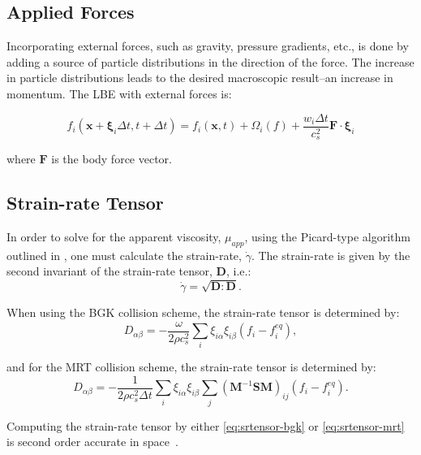 \documentclass[pdftex,ms]{pittetd}
\newcommand{\pos}{\mathbf{x}}
\newcommand{\pvel}{\boldsymbol{\xi}}
\newcommand{\transM}{\mathbf{M}}
\newcommand{\relaxM}{\mathbf{S}}
\begin{document}
\subsection{Applied Forces}

Incorporating external forces, such as gravity, pressure gradients, etc., is done by adding a source of particle distributions in the direction of the force.
The increase in particle distributions leads to the desired macroscopic result--an increase in momentum.
The LBE with external forces is:

\begin{equation}
f_i(\pos + \pvel_i \Delta t, t + \Delta t) = f_i(\pos, t) + \Omega_i(f) + \frac{w_i \Delta t}{c_s^2} \mathbf{F} \cdot \pvel_i
\end{equation}

\noindent where $\mathbf{F}$ is the body force vector.

\newcommand{\srtensor}{\mathbf{D}}

\subsection{Strain-rate Tensor}

In order to solve for the apparent viscosity, $\mu_{app}$, using the Picard-type algorithm outlined in , one must calculate the strain-rate, $\dot{\gamma}$.
The strain-rate is given by the second invariant of the strain-rate tensor, $\srtensor$, i.e.:
\begin{equation} \label{eq:second-invariant}
\dot{\gamma} = \sqrt{\srtensor : \srtensor}.
\end{equation}

\noindent When using the BGK collision scheme, the strain-rate tensor is determined by:
\begin{equation} \label{eq:srtensor-bgk}
D_{\alpha \beta} = -\frac{\omega}{2 \rho c_s^2} \sum_i \xi_{i \alpha} \xi_{i \beta} (f_i - f^{eq}_i),
\end{equation} %

\noindent and for the MRT collision scheme, the strain-rate tensor is determined by:
\begin{equation} \label{eq:srtensor-mrt}
D_{\alpha \beta} = -\frac{1}{2 \rho c_s^2 \Delta t} \sum_i \xi_{i \alpha} \xi_{i \beta} \sum_j (\transM^{-1} \relaxM \transM)_{ij}(f_i - f^{eq}_i).
\end{equation} %

\noindent Computing the strain-rate tensor by either \eqref{eq:srtensor-bgk} or \eqref{eq:srtensor-mrt} is second order accurate in space~\cite{kruger2009shear,kruger2010second}.
\end{document}
